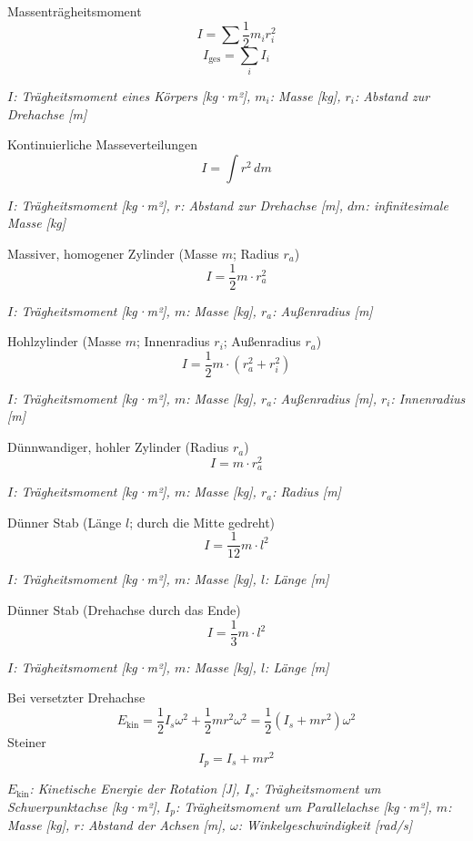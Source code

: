 \documentclass[a5paper,10pt]{article}
\newenvironment{displayformula}
{
	\begin{framed}
		\color{formulaColor}
	}
	{\end{framed}}
\newcommand{\formulalegend}[1]{%
	\par\vspace{0.5ex}%
	{{\color{legendColor}\RaggedRight\small\textit{#1}}}%
	\par\vspace{1.5ex}%
}
\begin{document}
\begin{displayformula}
	Massenträgheitsmoment
	\[
	I = \sum \frac{1}{2} m_i r_i^2 
	\]
	\[
	I_{\text{ges}} = \sum_i I_i
	\]
\end{displayformula}
\formulalegend{
	\( I \): Trägheitsmoment eines Körpers [kg·m²], \( m_i \): Masse [kg], \( r_i \): Abstand zur Drehachse [m]
}

\begin{displayformula}
	Kontinuierliche Masseverteilungen
	\[
	I = \int r^2 \, dm
	\]
\end{displayformula}
\formulalegend{
	\( I \): Trägheitsmoment [kg·m²], \( r \): Abstand zur Drehachse [m], \( dm \): infinitesimale Masse [kg]
}
\begin{displayformula}
	Massiver, homogener Zylinder (Masse \( m \); Radius \( r_a \))
	\[
	I = \frac{1}{2} m \cdot r_a^2
	\]
\end{displayformula}
\formulalegend{
	\( I \): Trägheitsmoment [kg·m²], \( m \): Masse [kg], \( r_a \): Außenradius [m]
}

\begin{displayformula}
	Hohlzylinder (Masse \( m \); Innenradius \( r_i \); Außenradius \( r_a \))
	\[
	I = \frac{1}{2} m \cdot (r_a^2 + r_i^2)
	\]
\end{displayformula}
\formulalegend{
	\( I \): Trägheitsmoment [kg·m²], \( m \): Masse [kg], \( r_a \): Außenradius [m], \( r_i \): Innenradius [m]
}

\begin{displayformula}
	Dünnwandiger, hohler Zylinder (Radius \( r_a \))
	\[
	I = m \cdot r_a^2
	\]
\end{displayformula}
\formulalegend{
	\( I \): Trägheitsmoment [kg·m²], \( m \): Masse [kg], \( r_a \): Radius [m]
}

\begin{displayformula}
	Dünner Stab (Länge \( l \); durch die Mitte gedreht)
	\[
	I = \frac{1}{12} m \cdot l^2
	\]
\end{displayformula}
\formulalegend{
	\( I \): Trägheitsmoment [kg·m²], \( m \): Masse [kg], \( l \): Länge [m]
}

\begin{displayformula}
	Dünner Stab (Drehachse durch das Ende)
	\[
	I = \frac{1}{3} m \cdot l^2
	\]
\end{displayformula}
\formulalegend{
	\( I \): Trägheitsmoment [kg·m²], \( m \): Masse [kg], \( l \): Länge [m]
}

\begin{displayformula}
	Bei versetzter Drehachse
	\[
	E_{\text{kin}} = \frac{1}{2} I_s \omega^2 + \frac{1}{2} m r^2 \omega^2 = \frac{1}{2} (I_s + m r^2) \omega^2
	\]
	Steiner
	\[
	I_p = I_s + m r^2
	\]
\end{displayformula}
\formulalegend{
	\( E_{\text{kin}} \): Kinetische Energie der Rotation [J], \( I_s \): Trägheitsmoment um Schwerpunktachse [kg·m²], \( I_p \): Trägheitsmoment um Parallelachse [kg·m²], \( m \): Masse [kg], \( r \): Abstand der Achsen [m], \( \omega \): Winkelgeschwindigkeit [rad/s]
}
\newpage
\end{document}
